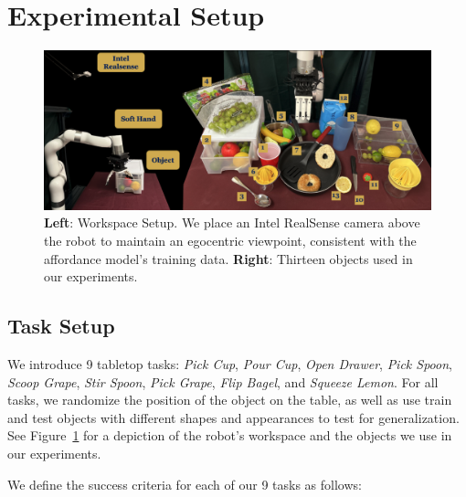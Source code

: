 \section{Experimental Setup}
\label{sec:setup}

\begin{figure}[H]
\centering
\includegraphics[width=\linewidth]{figs/workspace.pdf}
\vspace{-0.2in}
  \caption{\small \textbf{Left}: Workspace Setup. We place an Intel RealSense camera above the robot to maintain an egocentric viewpoint, consistent with the affordance model's training data. \textbf{Right}: Thirteen objects used in our experiments.}
 \label{fig:workspace}
 \vspace{-0.15in}
\end{figure}

\subsection{Task Setup} We introduce 9 tabletop tasks: \textit{Pick Cup}, \textit{Pour Cup}, \textit{Open Drawer}, \textit{Pick Spoon}, \textit{Scoop Grape}, \textit{Stir Spoon}, \textit{Pick Grape}, \textit{Flip Bagel}, and \textit{Squeeze Lemon}. For all tasks, we randomize the position of the object on the table, as well as use train and test objects with different shapes and appearances to test for generalization. See Figure~\ref{fig:workspace} for a depiction of the robot's workspace and the objects we use in our experiments.

We define the success criteria for each of our 9 tasks as follows:

